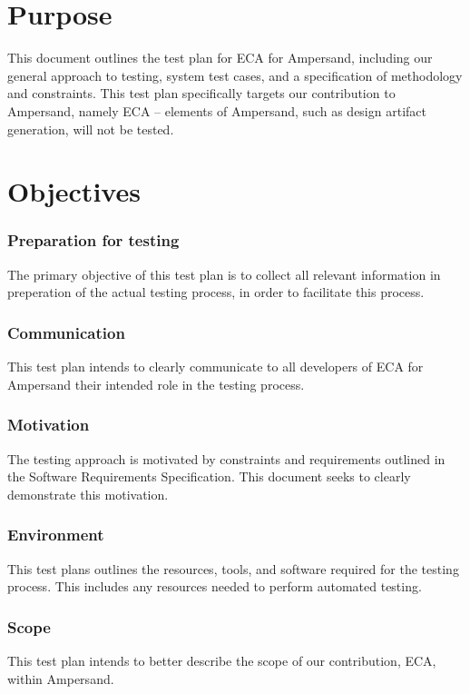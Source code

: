 \documentclass[12pt]{report}
\begin{document}
\section{Purpose}\label{sec:Purpose}
This document outlines the test plan for ECA for Ampersand, including our
general approach to testing, system test cases, and a specification of
methodology and constraints. This test plan specifically targets our
contribution to Ampersand, namely ECA -- elements of Ampersand, such as design
artifact generation, will not be tested. 

\section{Objectives}\label{sec:Objectives}
\subsubsection*{Preparation for testing}
The primary objective of this test plan is to collect all relevant information
in preperation of the actual testing process, in order to facilitate this process.

\subsubsection*{Communication}
This test plan intends to clearly communicate to all developers of ECA for Ampersand 
their intended role in the testing process. 

\subsubsection*{Motivation}
The testing approach is motivated by constraints and requirements outlined in the
Software Requirements Specification. This document seeks to clearly demonstrate
this motivation.

\subsubsection*{Environment}
This test plans outlines the resources, tools, and software required for the
testing process. This includes any resources needed to perform automated testing. 

\subsubsection*{Scope}
This test plan intends to better describe the scope of our contribution, ECA,
within Ampersand. 
\end{document}
